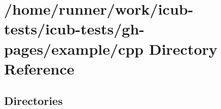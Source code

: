 \section{/home/runner/work/icub-\/tests/icub-\/tests/gh-\/pages/example/cpp Directory Reference}
\label{dir_c4278cdbadca2a5e8f60a98cd2517319}
\subsection*{Directories}
\begin{DoxyCompactItemize}
\end{DoxyCompactItemize}
